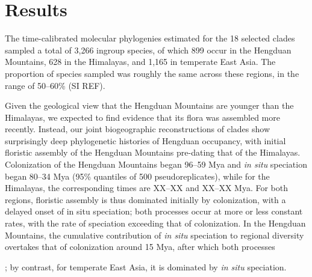 \section{Results}

The time-calibrated molecular phylogenies estimated for the 18 selected clades sampled a total of 3,266 ingroup species, of which 899 occur in the Hengduan Mountains, 628 in the Himalayas, and 1,165 in temperate East Asia. The proportion of species sampled was roughly the same across these regions, in the range of 50--60\% (SI REF).

Given the geological view that the Hengduan Mountains are younger than the Himalayas, we expected to find evidence that its flora was assembled more recently. Instead, our joint biogeographic reconstructions of clades show surprisingly deep phylogenetic histories of Hengduan occupancy, with initial floristic assembly of the Hengduan Mountains pre-dating that of the Himalayas. Colonization of the Hengduan Mountains began 96--59 Mya and \textit{in situ} speciation began 80--34 Mya (95\% quantiles of 500 pseudoreplicates), while for the Himalayas, the corresponding times are XX--XX and XX--XX Mya. For both regions, floristic assembly is thus dominated initially by colonization, with a delayed onset of in situ speciation; both processes occur at more or less constant rates, with the rate of speciation exceeding that of colonization. In the Hengduan Mountains, the cumulative contribution of \textit{in situ} speciation to regional diversity overtakes that of colonization around 15 Mya, after which both processes 

; by contrast, for temperate East Asia, it is dominated by \textit{in situ} speciation. 